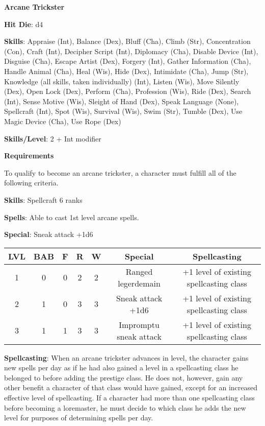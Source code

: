 \textbf{\huge{Arcane Trickster}}

\textbf{Hit Die}: d4

\textbf{Skills}: Appraise (Int), Balance (Dex), Bluff (Cha), Climb (Str), Concentration (Con), Craft (Int), Decipher Script (Int), Diplomacy (Cha), Disable Device (Int), Disguise (Cha), Escape Artist (Dex), Forgery (Int), Gather Information (Cha), Handle Animal (Cha), Heal (Wis), Hide (Dex), Intimidate (Cha), Jump (Str), Knowledge (all skills, taken individually) (Int), Listen (Wis), Move Silently (Dex), Open Lock (Dex), Perform (Cha), Profession (Wis), Ride (Dex), Search (Int), Sense Motive (Wis), Sleight of Hand (Dex), Speak Language (None), Spellcraft (Int), Spot (Wis), Survival (Wis), Swim (Str), Tumble (Dex), Use Magic Device (Cha), Use Rope (Dex)

\textbf{Skills/Level}: 2 + Int modifier

\textbf{\large{Requirements}}

To qualify to become an arcane trickster, a character must fulfill all of the following criteria.

\textbf{Skills}: Spellcraft 6 ranks

\textbf{Spells}: Able to cast 1st level arcane spells.

\textbf{Special}: Sneak attack +1d6

\begin{center}
\begin{adjustwidth}{-4cm}{}
\begin{small}
\begin{tabular}{| c | c | c | c | c | c | c |}
\hline
LVL &BAB &F &R &W &Special &Spellcasting \\
\hline
1 &0 &0 &2 &2 &Ranged legerdemain &+1 level of existing spellcasting class \\
2 &1 &0 &3 &3 &Sneak attack +1d6 &+1 level of existing spellcasting class \\
3 &1 &1 &3 &3 &Impromptu sneak attack &+1 level of existing spellcasting class \\
\hline
\end{tabular}
\end{small}
\end{adjustwidth}
\end{center}

\textbf{Spellcasting}: When an arcane trickster advances in level, the character gains new spells per day as if he had also gained a level in a spellcasting class he belonged to before adding the prestige class. He does not, however, gain any other benefit a character of that class would have gained, except for an increased effective level of spellcasting. If a character had more than one spellcasting class before becoming a loremaster, he must decide to which class he adds the new level for purposes of determining spells per day.



